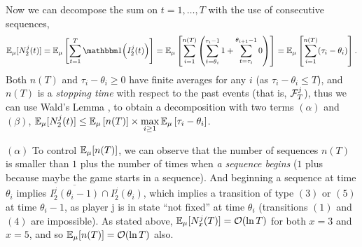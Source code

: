 \begin{smallproof}
  Now we can decompose the sum on $t=1,\dots,T$ with the use of consecutive sequences,
  \[
    \E_{\mu}[N_2^j(t)]
    = \E_{\mu}\left[ \sum_{t=1}^T \indic{\left(I_2^j(t)\right)} \right]
    =
    \E_{\mu}\left[ \sum_{i=1}^{n(T)} \left( \sum_{t=\theta_i}^{\tau_i - 1} 1 + \sum_{t=\tau_i}^{\theta_{i+1} - 1} 0 \right) \right]
    =
    \E_{\mu}\left[ \sum_{i=1}^{n(T)} (\tau_i - \theta_i) \right].
  \]
  Both $n(T)$ and $\tau_i - \theta_i \geq 0$ have finite averages for any $i$ (as $\tau_i - \theta_i \leq T$), and $n(T)$ is a \emph{stopping time} with respect to the past events (that is, $\mathcal{F}^j_T$),
  thus we can use Wald's Lemma \citep{Wald45},
  to obtain a decomposition with two terms $(\alpha)$ and $(\beta)$,
  $\mathbb{E}_{\mu}[N_2^j(t)] \leq \mathbb{E}_{\mu}\left[ n(T) \right] \times \max\limits_{i \geq 1} \mathbb{E}_{\mu}\left[ \tau_i - \theta_i \right]$.

  $(\alpha)$ To control $\mathbb{E}_{\mu}[n(T)]$, we can observe that
  the number of sequences $n(T)$ is smaller than $1$ plus the number of times when \emph{a sequence begins} ($1$ plus because maybe the game starts in a sequence).
  And beginning a sequence
  at time $\theta_i$ implies
  $\overline{I_2^j(\theta_i-1)} \cap I_2^j(\theta_i)$,
  which implies a transition of type $(3)$ or $(5)$ at time $\theta_i - 1$, as player j is in state ``not fixed'' at time $\theta_i$ (transitions $(1)$ and $(4)$ are impossible).
  As stated above, $\mathbb{E}_{\mu}[N_x^j(T)] = \mathop{}\mathopen{}\mathcal{O}\mathopen{}\left(\ln T\right)$ for both $x=3$ and $x=5$,
  and so $\mathbb{E}_{\mu}[n(T)] = \mathop{}\mathopen{}\mathcal{O}\mathopen{}\left(\ln T\right)$ also.



\end{smallproof}
